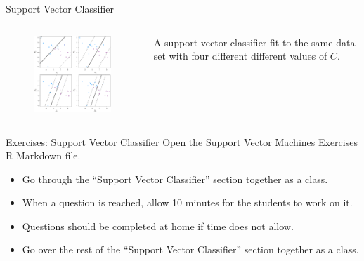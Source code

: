 \documentclass[
  ignorenonframetext,
  aspectratio=169,
]{beamer}
\begin{document}
\begin{frame}{Support Vector Classifier}
\protect\hypertarget{support-vector-classifier-4}{}
\begin{columns}[T]
\begin{column}{0.6\textwidth}
\begin{figure}

{\centering \includegraphics[width=2.91667in,height=\textheight]{images/4SVC.png}

}

\end{figure}
\end{column}

\begin{column}{0.4\textwidth}
A support vector classifier fit to the same data set with four different
different values of \(C\).
\end{column}
\end{columns}
\end{frame}

\begin{frame}{Exercises: Support Vector Classifier}
\protect\hypertarget{exercises-support-vector-classifier}{}
Open the Support Vector Machines Exercises R Markdown file.

\begin{itemize}
\item
  Go through the ``Support Vector Classifier'' section together as a
  class.
\item
  When a question is reached, allow 10 minutes for the students to work
  on it.
\item
  Questions should be completed at home if time does not allow.
\item
  Go over the rest of the ``Support Vector Classifier'' section together
  as a class.
\end{itemize}
\end{frame}
\end{document}
